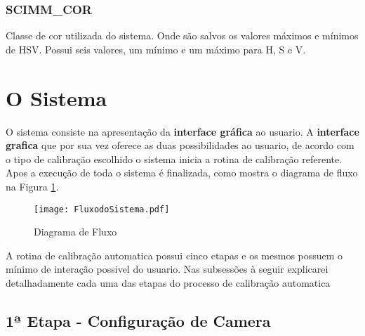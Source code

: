 \subsubsection{SCIMM\_COR}
	Classe de cor utilizada do sistema. Onde são salvos os valores máximos e mínimos de HSV. Possui seis valores, um mínimo e um máximo para H, S e V. 


\section{O Sistema}

		 O sistema consiste na apresentação da \textbf{interface gráfica} ao usuario. A \textbf{interface grafica} que por sua vez oferece as duas possibilidades ao usuario, de acordo com o tipo de calibração escolhido o sistema inicia a rotina de calibração referente. Apos a execução de toda o sistema é finalizada, como mostra o diagrama de fluxo na Figura \ref{FlowCHart}.
		
		\begin{figure}[H]
			\centering
			\texttt{[image: FluxodoSistema.pdf]}
			\caption{Diagrama de Fluxo}
			\label{FlowCHart}
		\end{figure}			
	 
		A rotina de calibração automatica possui cinco etapas e os mesmos possuem o mínimo de interação possivel do usuario. Nas subsessões à seguir explicarei detalhadamente cada uma das etapas do processo de calibração automatica
		\subsection{1ª Etapa - Configuração de Camera}
		

